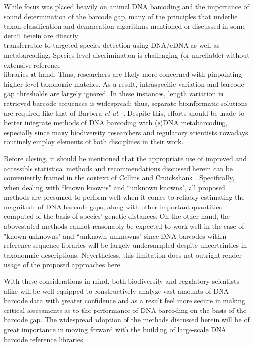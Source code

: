 While focus was placed heavily on animal DNA barcoding and the importance of sound determination of the barcode gap, many of the principles that underlie taxon classification and demarcation algorithms mentioned or discussed in some detail herein are directly \\ transferrable to targeted species detection using DNA/eDNA as well as metabarcoding. Species-level discrimination is challenging (or unreliable) without extensive reference \\ libraries at hand. Thus, researchers are likely more concerned with pinpointing higher-level taxonomic matches. As a result, intraspecific variation and  barcode gap thresholds are largely ignored. In these instances, length variation in retrieved barcode sequences is widespread; thus, separate bioinformatic solutions are required like that of Barbera \textit{et al.}~\cite{barbera2019epang}. Despite this, efforts should be made to better integrate methods of DNA barcoding with (e)DNA metabarcoding, especially since many biodiversity researchers and regulatory scientists nowadays routinely employ elements of both disciplines in their work. 

    
Before closing, it should be mentioned that the appropriate use of improved and \\ accessible statistical methods and recommendations discussed herein can be conveniently framed in the context of Collins and Cruickshank \cite{collins2014known}. Specifically, when dealing with ``known knowns" and ``unknown knowns", all proposed methods are presumed to perform well when it comes to reliably estimating the magnitude of DNA barcode gaps, along with other important quantities computed of the basis of species' genetic distances. On the other hand, the abovestated methods cannot reasonably be expected to work well in the case of "known unknowns" and ``unknown unknowns" since DNA barcodes within reference sequence libraries will be largely undersampled despite uncertainties in taxononmic descriptions. Nevertheless, this limitation does not outright render usage of the proposed approaches here. 

With these considerations in mind, both biodiversity and regulatory scientists alike will be well-equipped to constructively analyze vast amounts of DNA barcode data with greater confidence and as a result feel more secure in making critical assessments as to the performance of DNA barcoding on the basis of the barcode gap. The widespread adoption of the methods discussed herein will be of great importance in moving forward with the building of large-scale DNA barcode reference libraries.
